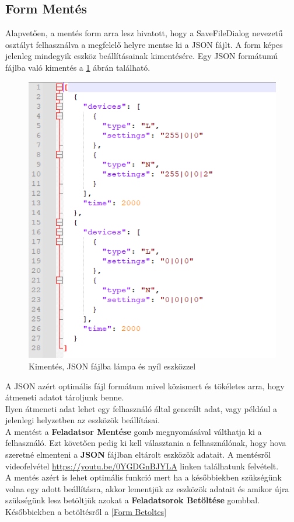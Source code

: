 \documentclass[tocnopagenum]{thesis-ekf}
\theoremstyle{definition}
\theoremstyle{remark}
\begin{document}
	
	\subsection{Form Mentés}
	\label{Form Mentes}
	 Alapvetően, a mentés form arra lesz hivatott, hogy a SaveFileDialog nevezetű osztályt felhasználva a megfelelő helyre mentse ki a JSON fájlt. A form képes jelenleg mindegyik eszköz beállításainak kimentésére. Egy JSON formátumú fájlba való kimentés a \ref{fig:keteszkozkimentes} ábrán található.
	 \begin{figure}[H]	
	 	\centering
	 	\includegraphics[scale=0.7]{két_eszköz_kimentésének_a_JSON_fájlja}
	 	\caption[Kimentés, JSON fájlba lámpa és nyíl eszközzel]{Kimentés, JSON fájlba lámpa és nyíl eszközzel}
	 	\label{fig:keteszkozkimentes}
	 \end{figure}

	A JSON azért optimális fájl formátum mivel közismert és tökéletes arra, hogy átmeneti adatot tároljunk benne. 
	\\
	Ilyen átmeneti adat lehet egy felhasználó által generált adat, vagy például a jelenlegi helyzetben az eszközök beállításai. 
	\\
	A mentést a \textbf{Feladatsor Mentése} gomb megnyomásával válthatja ki a felhasználó. Ezt követően pedig ki kell választania a felhasználónak, hogy hova szeretné elmenteni a \textbf{JSON} fájlban eltárolt eszközök adatait.
	A mentésről videofelvétel \url{https://youtu.be/0YGDGnBJYLA} linken találhatunk felvételt.
	\\
	A mentés azért is lehet optimális funkció mert ha a későbbiekben szükségünk volna egy adott beállításra, akkor lementjük az eszközök adatait és amikor újra szükségünk lesz betöltjük azokat a \textbf{Feladatsorok Betöltése} gombbal. Későbbiekben a betöltésről a \ref{Form Betoltes}
\end{document}

